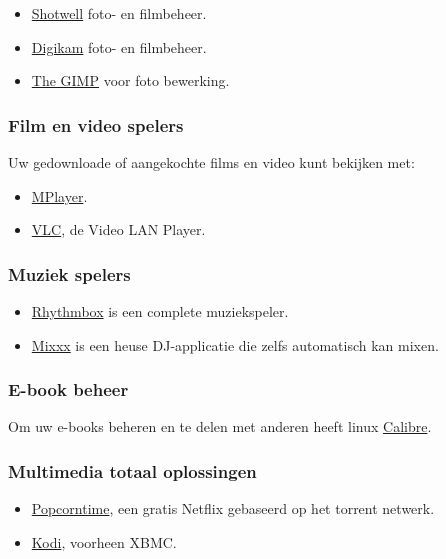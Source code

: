 \begin{itemize}
	\item \href{https://wiki.gnome.org/Apps/Shotwell}{Shotwell} foto- en filmbeheer.
	\item \href{https://www.digikam.org/}{Digikam}  foto- en filmbeheer.
	\item \href{http://www.gimp.org/}{The GIMP} voor foto bewerking.
\end{itemize}

\subsubsection{Film en video spelers}
Uw gedownloade of aangekochte films en video kunt bekijken met:
\begin{itemize}
	\item \href{http://www.mplayer.org/}{MPlayer}.
	\item \href{http://www.videolan.org/vlc/}{VLC}, de Video LAN Player.
\end{itemize}

\subsubsection{Muziek spelers}
\begin{itemize}
	\item \href{https://wiki.gnome.org/Apps/Rhythmbox}{Rhythmbox} is een complete muziekspeler.
	\item \href{http://mixxx.org/}{Mixxx} is een heuse DJ-applicatie die zelfs automatisch kan mixen.
\end{itemize}

\subsubsection{E-book beheer}
Om uw e-books beheren en te delen met anderen heeft linux \href{http://calibre-ebook.com/}{Calibre}.

\subsubsection{Multimedia totaal oplossingen}
\begin{itemize}
	\item \href{http://popcorntime.io/}{Popcorntime}, een gratis Netflix gebaseerd op het torrent netwerk.
		\item \href{http://kodi.tv/}{Kodi}, voorheen XBMC.
\end{itemize}

